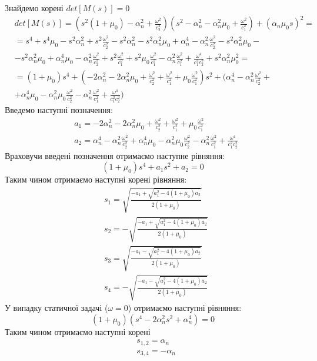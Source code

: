 Знайдемо корені $det[M(s)]=0$
\begin{align*}
    &det[M(s)] = (s^2 (1 + \mu_0) -\alpha_n^2 + \frac{\omega^2}{c_2^2})(s^2 - \alpha_n^2 - \alpha_n^2\mu_0 + \frac{\omega^2}{c_1^2}) + (\alpha_n \mu_0 s)^2 = \\
    &= s^4 + s^4 \mu_0 - s^2 \alpha_n^2 + s^2 \frac{\omega^2}{c_2^2} - s^2 \alpha_n^2 - s^2 \alpha_n^2 \mu_0 + \alpha_n^4 - \alpha_n^2 \frac{\omega^2}{c_2^2} - s^2 \alpha_n^2 \mu_0 - \\
    &- s^2 \alpha_n^2 \mu_0 + \alpha_n^4 \mu_0 - \alpha_n^2 \frac{\omega^2}{c_2^2} + s^2 \frac{\omega^2}{c_1^2} + s^2 \mu_0 \frac{\omega^2}{c_1^2} - \alpha_n^2 \frac{\omega^2}{c_1^2} + \frac{\omega^4}{c_1^2 c_2^2} + s^2 \alpha_n^2 \mu_0^2 = \\
    &=(1 + \mu_0) s^4 + (-2 \alpha_n^2 - 2 \alpha_n^2 \mu_0 + \frac{\omega^2}{c_2^2} + \frac{\omega^2}{c_1^2} + \mu_0 \frac{\omega^2}{c_1^2}) s^2 + (\alpha_n^4 - \alpha_n^2 \frac{\omega^2}{c_2^2} + \\ 
    &+ \alpha_n^4 \mu_0 - \alpha_n^2 \mu_0 \frac{\omega^2}{c_2^2} - \alpha_n^2 \frac{\omega^2}{c_1^2} + \frac{\omega^4}{c_1^2 c_2^2})
\end{align*}
Введемо наступні позначення:
\begin{align*}
    &a_1 = -2 \alpha_n^2 - 2 \alpha_n^2 \mu_0 + \frac{\omega^2}{c_2^2} + \frac{\omega^2}{c_1^2} + \mu_0 \frac{\omega^2}{c_1^2} \\
    &a_2 = \alpha_n^4 - \alpha_n^2 \frac{\omega^2}{c_2^2} + \alpha_n^4 \mu_0 - \alpha_n^2 \mu_0 \frac{\omega^2}{c_2^2} - \alpha_n^2 \frac{\omega^2}{c_1^2} + \frac{\omega^4}{c_1^2 c_2^2}
\end{align*}
Враховучи введені позначення отримаємо наступне рівняння:
\begin{equation*}
    (1 + \mu_0) s^4 + a_1 s^2 + a_2 = 0
\end{equation*}
Таким чином отримаємо наступні корені рівняння:
\begin{align*}
    &s_1 = \sqrt{\frac{ -a_1 + \sqrt{a_1^2 - 4(1 + \mu_0)a_2}}{2 (1 + \mu_0)}} \\
    &s_2 = -\sqrt{\frac{ -a_1 + \sqrt{a_1^2 - 4(1 + \mu_0)a_2}}{2 (1 + \mu_0)}} \\
    &s_3 = \sqrt{\frac{ -a_1 - \sqrt{a_1^2 - 4(1 + \mu_0)a_2}}{2 (1 + \mu_0)}} \\
    &s_4 = -\sqrt{\frac{ -a_1 - \sqrt{a_1^2 - 4(1 + \mu_0)a_2}}{2 (1 + \mu_0)}}
\end{align*}
У випадку статичної задачі ($\omega = 0$) отримаємо наступні рівняння:
\begin{equation*}
    (1 + \mu_0) (s^4 - 2 \alpha_n^2 s^2 + \alpha_n^4) = 0
\end{equation*}
Таким чином отримаємо наступні корені
\begin{align*}
    &s_{1,2} = \alpha_n \\
    &s_{3, 4} = -\alpha_n
\end{align*}
